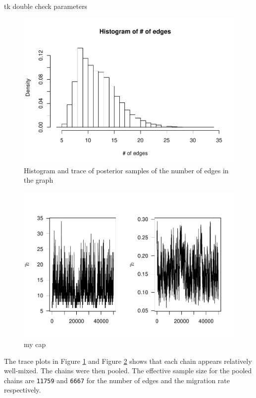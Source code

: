 \documentclass[11pt,a4paper]{article}
\numberwithin{equation}{section}
\begin{document}
tk double check parameters

\begin{figure}
\centering
\includegraphics{thesis_draft_files/figure-latex/unnamed-chunk-9-1.pdf}
\caption{\label{fig:hist_edges} Histogram and trace of posterior samples
of the number of edges in the graph}
\end{figure}

\begin{figure}
\centering
\includegraphics{thesis_draft_files/figure-latex/unnamed-chunk-10-1.pdf}
\caption{\label{fig:migration} my cap}
\end{figure}

The trace plots in Figure \ref{fig:hist_edges} and Figure
\ref{fig:migration} shows that each chain appears relatively well-mixed.
The chains were then pooled. The effective sample size for the pooled
chains are \texttt{11759} and \texttt{6667} for the number of edges and
the migration rate respectively.
\end{document}
